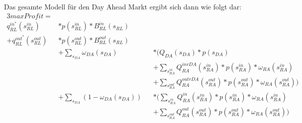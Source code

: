 \documentclass{article}
\begin{document}
Das gesamte Modell für den Day Ahead Markt ergibt sich dann wie folgt dar:
\begin{alignat*}{3}  
max Profit  =&\\
q^{in^*}_{RL} (s^{in}_{RL})& * p(s^{in}_{RL}) * B^{in}_{RL} (s_{RL}) \\
+ q^{out^*}_{RL}(s^{out}_{RL})& * p(s^{out}_{RL}) * B^{out}_{RL} (s_{RL})\\
		&+ \sum_{s_{DA}}\omega_{DA}(s_{DA})&& * \Biggl(Q_{DA}(s_{DA}) * p(s_{DA}) \\
		&	    && + \sum_{s^{in}_{RA}} Q^{inrDA}_{RA}(s^{in}_{RA}) * p(s^{in}_{RA}) * \omega_{RA}(s^{in}_{RA})\\
	&		&& + \sum_{s^{out}_{RA}} Q^{outrDA}_{RA}(s^{out}_{RA}) * p(s^{out}_{RA}) * \omega_{RA}(s^{out}_{RA})\Biggr)\\
		& + \sum_{s_{DA}}(1-\omega_{DA}(s_{DA}))&& * \Biggl(\sum_{s^{in}_{RA}} Q^{in}_{RA}(s^{in}_{RA}) * p(s^{in}_{RA}) *             \omega_{RA}(s^{in}_{RA})\\
	&		&& + \sum_{s^{out}_{RA}} Q^{out}_{RA}(s^{out}_{RA}) * p(s^{out}_{RA}) * \omega_{RA}(s^{out}_{RA}) \Biggr) \\
\end{alignat*}
\end{document}
